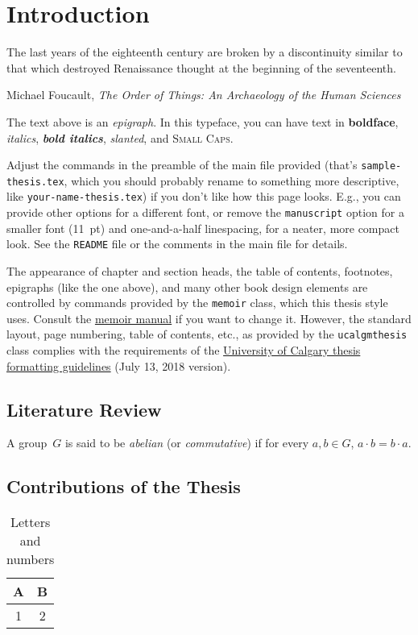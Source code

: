 
\chapter{Introduction}

\epigraph{The last years of the eighteenth century are broken by a
discontinuity similar to that which destroyed Renaissance thought at
the beginning of the seventeenth.}{Michael Foucault, \emph{The Order
of Things: An Archaeology of the Human Sciences}}

The text above is an \emph{epigraph}. In this typeface, you can have
text in \textbf{boldface}, \emph{italics}, \textbf{\emph{bold
    italics}}, \textsl{slanted}, and \textsc{Small Caps}.

Adjust the commands in the preamble of the main file provided
(that's \verb+sample-thesis.tex+, which you should probably rename to
something more descriptive, like \verb+your-name-thesis.tex+) if you
don't like how this page looks. E.g., you can provide other options for a
different font, or remove the \verb+manuscript+ option for a smaller
font (11~pt) and one-and-a-half linespacing, for a neater, more
compact look. See the \verb+README+ file or the comments in the main
file for details.

The appearance of chapter and section heads, the table of contents,
footnotes, epigraphs (like the one above), and many other book design
elements are controlled by commands provided by the \verb|memoir|
class, which this thesis style uses. Consult the
\href{https://ctan.org/pkg/memoir}{memoir manual} if you want to
change it. However, the standard layout, page numbering, table of
contents, etc., as provided by the \verb|ucalgmthesis| class complies
with the requirements of the
\href{https://grad.ucalgary.ca/current-students/thesis-based-students/thesis/building-thesis}{University
of Calgary thesis formatting guidelines} (July 13, 2018 version).

\section{Literature Review}

\blindtext\pagenote{\blindtext}

\blindtext[2]

\begin{defn}
A group~$G$ is said to be \emph{abelian} (or \emph{commutative}) if
for every $a, b \in G$, $a \cdot b = b \cdot a$.
\end{defn}

\blindtext[2]

\section{Contributions of the Thesis}

\blindtext[3]

\begin{table}
  \begin{center}
  \begin{tabular}{c|c}
    A & B \\
    \hline
    1 & 2
  \end{tabular}
  \end{center}
  \caption{Letters and numbers}
\end{table}

\blindtext[3]
